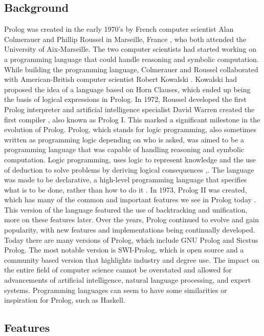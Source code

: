 \documentclass{article}
\theoremstyle{theorem}
\theoremstyle{definition}
\theoremstyle{remark}
\begin{document}
\subsection{Background}
Prolog was created in the early 1970’s by French computer scientist Alan Colmerauer and Phillip Roussel in Marseille, France \cite{(1)}
, who both attended the University of Aix-Marseille. The two computer scientists had started working on a programming language that could handle reasoning and symbolic computation. While building the programming language, Colmerauer and Roussel collaborated with American-British computer scientist Robert Kowalski \cite{(2)}. Kowalski had proposed the idea of a language based on Horn Clauses, which ended up being the basis of logical expressions in Prolog. In 1972, Roussel developed the first Prolog interpreter and artificial intelligence specialist David Warren created the first compiler \cite{(3)}, also known as Prolog I. This marked a significant milestone in the evolution of Prolog. Prolog, which stands for logic programming, also sometimes written as programming logic depending on who is asked, was aimed to be a programming language that was capable of handling reasoning and symbolic computation. Logic programming, uses logic to represent knowledge and the use of deduction to solve problems by deriving logical consequences \cite{(3)},. The language was made to be declarative, a high-level programming language that specifies what is to be done, rather than how to do it \cite{(4)}. In 1973, Prolog II was created, which has many of the common and important features we see in Prolog today \cite{(5)}. This version of the language featured the use of backtracking \cite{(5)} and unification, more on these features later. Over the years, Prolog continued to evolve and gain popularity, with new features and implementations being continually developed. Today there are many versions of Prolog, which include GNU Prolog and Sicstus Prolog. The most notable version is SWI-Prolog, which is open source \cite{(6)} and a community based version that highlights industry and degree use. The impact on the entire field of computer science cannot be overstated and allowed for advancements of artificial intelligence, natural language processing, and expert systems. Programming languages can seem to have some similarities or inspiration for Prolog, such as Haskell.

\subsection{Features}
\end{document}

